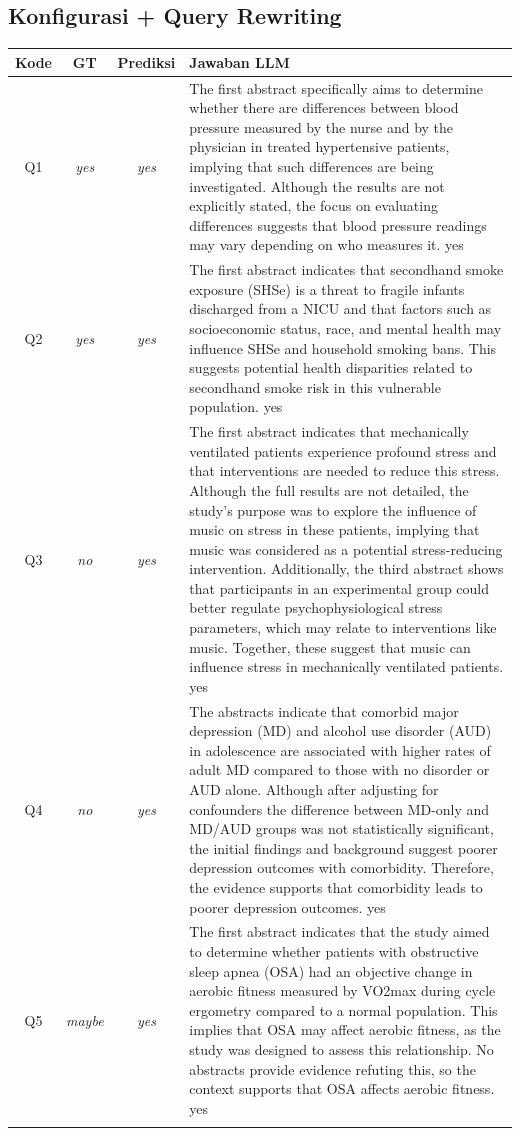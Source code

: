 \subsection*{Konfigurasi + Query Rewriting}
\begin{longtable}{@{}c c c >{\raggedright\arraybackslash}p{8.8cm}@{}}
\toprule
\textbf{Kode} & \textbf{GT} & \textbf{Prediksi} & \textbf{Jawaban LLM} \\
\midrule\endhead
Q1 & \textit{yes} & \textit{yes} & The first abstract specifically aims to determine whether there are differences between blood pressure measured by the nurse and by the physician in treated hypertensive patients, implying that such differences are being investigated. Although the results are not explicitly stated, the focus on evaluating differences suggests that blood pressure readings may vary depending on who measures it. yes \\
\addlinespace
Q2 & \textit{yes} & \textit{yes} & The first abstract indicates that secondhand smoke exposure (SHSe) is a threat to fragile infants discharged from a NICU and that factors such as socioeconomic status, race, and mental health may influence SHSe and household smoking bans. This suggests potential health disparities related to secondhand smoke risk in this vulnerable population. yes \\
\addlinespace
Q3 & \textit{no} & \textit{yes} & The first abstract indicates that mechanically ventilated patients experience profound stress and that interventions are needed to reduce this stress. Although the full results are not detailed, the study's purpose was to explore the influence of music on stress in these patients, implying that music was considered as a potential stress-reducing intervention. Additionally, the third abstract shows that participants in an experimental group could better regulate psychophysiological stress parameters, which may relate to interventions like music. Together, these suggest that music can influence stress in mechanically ventilated patients. yes \\
\addlinespace
Q4 & \textit{no} & \textit{yes} & The abstracts indicate that comorbid major depression (MD) and alcohol use disorder (AUD) in adolescence are associated with higher rates of adult MD compared to those with no disorder or AUD alone. Although after adjusting for confounders the difference between MD-only and MD/AUD groups was not statistically significant, the initial findings and background suggest poorer depression outcomes with comorbidity. Therefore, the evidence supports that comorbidity leads to poorer depression outcomes. yes \\
\addlinespace
Q5 & \textit{maybe} & \textit{yes} & The first abstract indicates that the study aimed to determine whether patients with obstructive sleep apnea (OSA) had an objective change in aerobic fitness measured by VO2max during cycle ergometry compared to a normal population. This implies that OSA may affect aerobic fitness, as the study was designed to assess this relationship. No abstracts provide evidence refuting this, so the context supports that OSA affects aerobic fitness. yes \\
\addlinespace
\bottomrule
\end{longtable}

